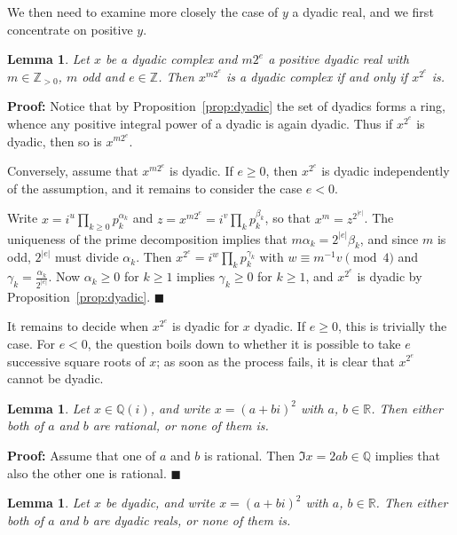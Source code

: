 \documentclass [11pt]{article}
\newcommand {\Z}{\mathbb Z}
\newcommand {\Q}{\mathbb Q}
\newcommand {\R}{\mathbb R}
\renewcommand {\geq}{\geqslant}
\newtheorem{lemma}[theorem]{Lemma}
\newenvironment{proof}{\noindent \textbf {Proof:}}{{\hspace* {\fill}$\blacksquare$}}
\begin{document}
We then need to examine more closely the case of $y$ a dyadic real,
and we first concentrate on positive $y$.

\begin{lemma}
\label{lemma1}
Let $x$ be a dyadic complex and $m 2^e$ a positive dyadic real
with $m \in \Z_{>0}$, $m$ odd and $e \in \Z$.
Then $x^{m 2^e}$ is a dyadic complex if and only if $x^{2^e}$ is.
\end{lemma}

\begin{proof}
Notice that by Proposition~\ref {prop:dyadic} the set of dyadics forms
a ring, whence any positive integral power of a dyadic is again dyadic.
Thus if $x^{2^e}$ is dyadic, then so is $x^{m 2^e}$.

Conversely, assume that $x^{m 2^e}$ is dyadic. If $e \geq 0$,
then $x^{2^e}$ is dyadic independently of the assumption,
and it remains to consider the case $e < 0$.

Write $x = i^u \prod_{k \geq 0} p_k^{\alpha_k}$
and $z = x^{m 2^e} = i^v \prod_k p_k^{\beta_k}$, so that $x^m = z^{2^{|e|}}$.
The uniqueness of the prime decomposition implies that
$m \alpha_k = 2^{|e|} \beta_k$, and since $m$ is odd, $2^{|e|}$ must
divide $\alpha_k$. Then
$x^{2^e} = i^w \prod_k p_k^{\gamma_k}$ with $w \equiv m^{-1} v \pmod 4$ and
$\gamma_k = \frac {\alpha_k}{2^{|e|}}$.
Now $\alpha_k \geq 0$ for $k \geq 1$ implies $\gamma_k \geq 0$ for $k \geq 1$,
and $x^{2^e}$ is dyadic by Proposition~\ref {prop:dyadic}.
\end{proof}

It remains to decide when $x^{2^e}$ is dyadic for $x$ dyadic. If $e \geq 0$,
this is trivially the case. For $e < 0$, the question boils down to whether
it is possible to take $e$ successive square roots of $x$; as soon as the
process fails, it is clear that $x^{2^e}$ cannot be dyadic.

\begin{lemma}
\label {lm:sqrtrat}
Let $x \in \Q (i)$, and write $x = (a + b i)^2$ with $a$, $b \in \R$.
Then either both of $a$ and $b$ are rational, or none of them is.
\end{lemma}

\begin{proof}
Assume that one of $a$ and $b$ is rational. Then $\Im x = 2 a b \in \Q$
implies that also the other one is rational.
\end{proof}

\begin{lemma}
Let $x$ be dyadic, and write $x = (a + b i)^2$ with $a$, $b \in \R$.
Then either both of $a$ and $b$ are dyadic reals, or none of them is.
\end{lemma}
\end{document}
